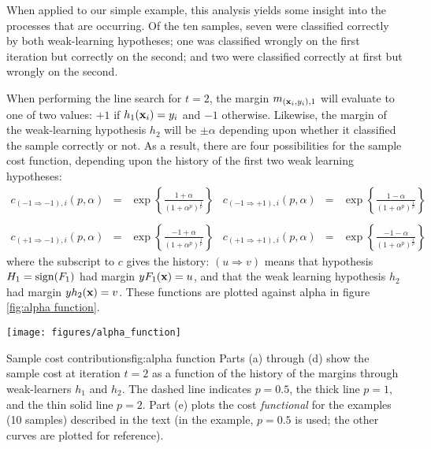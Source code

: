 When applied to our simple example, this analysis yields some
insight into the processes that are occurring.  Of the ten samples,
seven were classified correctly by both weak-learning hypotheses; one
was classified wrongly on the first iteration but correctly on the
second; and two were classified correctly at first but wrongly on the
second.

When performing the line search for $t=2$, the margin $m_{(\mathbf{x}_i,
y_i), 1}$ will evaluate to one of two values: $+1$ if  $h_1(\mathbf{x}_i) =
y_i$ and $-1$ otherwise.  Likewise, the margin of the weak-learning
hypothesis $h_2$ will be $\pm \alpha$ depending upon whether it
classified the sample correctly or not.  As a result, there are four
possibilities for the sample cost function, depending upon the history
of the first two weak learning hypotheses: 
%
\providecommand{\ra}{\Rightarrow}
\providecommand{\Pn}{(1 + \alpha^p)^{\frac{1}{p}}}
\begin{equation}
\begin{array}{rclrcl}
c_{(-1 \ra -1),i}(p,\alpha) & = & \exp \left\{ \frac{ 1 + \alpha}{\Pn} \right\} &
c_{(-1 \ra +1),i}(p,\alpha) & = & \exp \left\{ \frac{ 1 - \alpha}{\Pn}
\right\} \\
& & & & & \\ %
c_{(+1 \ra -1),i}(p,\alpha) & = & \exp \left\{ \frac{-1 + \alpha}{\Pn} \right\} &
c_{(+1 \ra +1),i}(p,\alpha) & = & \exp \left\{ \frac{-1 - \alpha}{\Pn} \right\}
\end{array}
\end{equation}
%
where the subscript to $c$ gives the history: $(u \ra v)$ means that
hypothesis $H_1 = \mathrm{sign}(F_1)$ had margin $yF_1(\mathbf{x}) = u$, and that
the weak learning hypothesis $h_{2}$ had margin $yh_2(\mathbf{x}) =
v$. These functions are plotted against alpha in figure \ref{fig:alpha
function}. 

\begin{linefigure}
\begin{center}
\hspace*{-0.5cm}\texttt{[image: figures/alpha\_function]}
\end{center}
\begin{capt}{Sample cost contributions}{fig:alpha function}
Parts (a) through (d) show the sample cost at iteration $t=2$ as a
function of the history of the margins through weak-learners $h_1$ and
$h_2$.  The dashed line indicates $p=0.5$, the thick line $p=1$, and
the thin solid line $p=2$.  Part (e) plots the cost \emph{functional}
for the examples (10 samples) described in the text (in the example,
$p=0.5$ is used; the other curves are plotted for reference).
\end{capt}
\end{linefigure}

